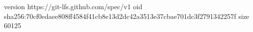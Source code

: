 version https://git-lfs.github.com/spec/v1
oid sha256:70cf0edaee808ff4584f41cb8e13d2dc42a3513e37cbae701dc3f2791342257f
size 60125
